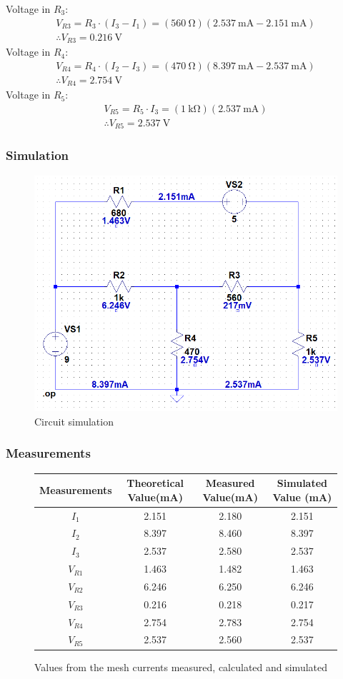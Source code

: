 \documentclass[letterpaper]{article}
\begin{document}
Voltage in $R_3$:
\begin{gather*}V_{R3} = R_3\cdot(I_3-I_1)
    =(\SI{560}{\ohm})(\SI{2.537}{\milli\ampere}-\SI{2.151}{\milli\ampere})\\\therefore V_{R3} =
\SI{0.216}{\volt}
\end{gather*}
Voltage in $R_4$:
\begin{gather*}V_{R4} = R_4\cdot(I_2-I_3)
    =(\SI{470}{\ohm})(\SI{8.397}{\milli\ampere}-\SI{2.537}{\milli\ampere})\\\therefore V_{R4} =
\SI{2.754}{\volt}
\end{gather*}
Voltage in $R_5$:
\begin{gather*}V_{R5} = R_5\cdot I_3
    =(\SI{1}{\kilo\ohm})(\SI{2.537}{\milli\ampere})\\\therefore V_{R5} =
\SI{2.537}{\volt}
\end{gather*}
\subsubsection{Simulation}
\begin{figure}[H]
    \centering
    \includegraphics[width=.56\linewidth]{sim1}
    \caption{Circuit simulation}
\end{figure}
\subsubsection{Measurements}
\begin{figure}[H]
    \centering
    \begin{tabular}{|c|c|c|c|}\hline
        Measurements & Theoretical Value(\si{\milli\ampere}) & Measured Value(\si{\milli\ampere}) &
        Simulated Value (\si{\milli\ampere})\\\hline
        $I_{1}$ & 2.151 & 2.180 & 2.151 \\\hline
        $I_{2}$ & 8.397 & 8.460 & 8.397 \\\hline
        $I_{3}$ & 2.537 & 2.580 & 2.537 \\\hline
        $V_{R1}$ & 1.463 & 1.482 & 1.463 \\\hline 
        $V_{R2}$ & 6.246 & 6.250 & 6.246 \\\hline 
        $V_{R3}$ & 0.216 & 0.218 & 0.217 \\\hline 
        $V_{R4}$ & 2.754 & 2.783 & 2.754 \\\hline 
        $V_{R5}$ & 2.537 & 2.560 & 2.537 \\\hline 
    \end{tabular}
    \caption{Values from the mesh currents measured, calculated and simulated}
\end{figure}
\end{document}
